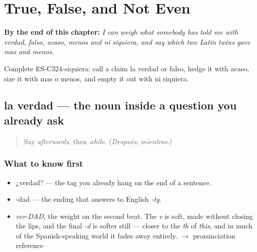 
\chapter{True, False, and Not Even}
\label{ch:verdad-y-siquiera}

\begin{chapteropening}
\textbf{By the end of this chapter:} \emph{I can weigh what somebody has told me with verdad, falso, acaso, menos and ni siquiera, and say which two Latin twins gave mas and menos.}

Complete ES-C324-siquiera: call a claim la verdad or falso, hedge it with acaso, size it with mas o menos, and empty it out with ni siquiera.
\end{chapteropening}

\section[la verdad]{la verdad — the noun inside a question you already ask}

\label{lesson:ES-C324-verdad}



\begin{quote}
Say \emph{afterwards}, then \emph{while}. (\emph{Después}; \emph{mientras}.)
\end{quote}

\subsection*{What to know first}
\begin{itemize}
\raggedright
  \item ¿verdad? — the tag you already hang on the end of a sentence.
  \item -dad — the ending that answers to English \emph{-ty}.
\end{itemize}

\begin{sounds}
\begin{itemize}
\raggedright
  \item \emph{ver-DAD}, the weight on the second beat. The \emph{v} is soft, made without closing the lips, and the final \emph{-d} is softer still — closer to the \emph{th} of \emph{this}, and in much of the Spanish-speaking world it fades away entirely. $\to$ pronunciation reference
\end{itemize}
\end{sounds}

